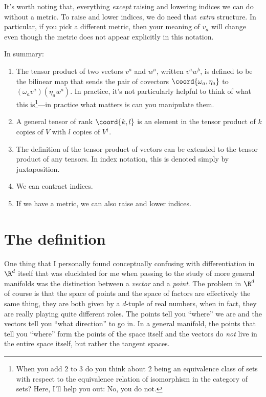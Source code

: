 It's worth noting that, everything \emph{except} raising and lowering indices we can do without a metric.  To raise and lower indices, we do need that \emph{extra} structure.  In particular, if you pick a different metric, then your meaning of $v_a$ will change even though the metric does not appear explicitly in this notation.

In summary:
\begin{enumerate}
\item The tensor product of two vectors $v^a$ and $w^a$, written $v^aw^b$, is defined to be the bilinear map that sends the pair of covectors $\coord{\omega _a,\eta _a}$ to $(\omega _av^a)(\eta _aw^a)$.  In practice, it's not particularly helpful to think of what this is\footnote{When you add $2$ to $3$ do you think about $2$ being an equivalence class of sets with respect to the equivalence relation of isomorphism in the category of sets?  Here, I'll help you out:  No, you do not.}---in practice what matters is can you manipulate them.
\item A general tensor of rank $\coord{k,l}$ is an element in the tensor product of $k$ copies of $V$ with $l$ copies of $V^{\dagger}$.
\item The definition of the tensor product of vectors can be extended to the tensor product of any tensors.  In index notation, this is denoted simply by juxtaposition.
\item We can contract indices.
\item If we have a metric, we can also raise and lower indices.
\end{enumerate}

\section{The definition}

One thing that I personally found conceptually confusing with differentiation in $\R ^d$ itself that was elucidated for me when passing to the study of more general manifolds was the distinction between a \emph{vector} and a \emph{point}.  The problem in $\R ^d$ of course is that the space of points and the space of factors are effectively the same thing, they are both given by a $d$-tuple of real numbers, when in fact, they are really playing quite different roles.  The points tell you ``where'' we are and the vectors tell you ``what direction'' to go in.  In a general manifold, the points that tell you ``where'' form the points of the space itself and the vectors do \emph{not} live in the entire space itself, but rather the tangent spaces.

